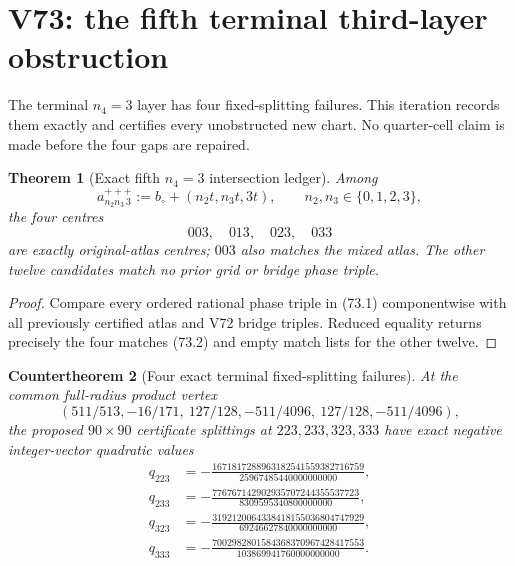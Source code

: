 \documentclass[11pt,oneside]{article}
\newtheorem{theorem}{Theorem}[section]
\newtheorem{countertheorem}[theorem]{Countertheorem}
\theoremstyle{definition}
\theoremstyle{remark}
\begin{document}
\section{V73: the fifth terminal third-layer obstruction}
\label{sec:newv73-fifth-terminal-obstruction}

The terminal \(n_4=3\) layer has four fixed-splitting failures.
This iteration records them exactly and certifies every unobstructed
new chart.  No quarter-cell claim is made before the four gaps are
repaired.

\begin{theorem}[Exact fifth \(n_4=3\) intersection ledger]
\label{thm:newv73-intersections}
Among
\[
 a_{n_2n_3\,3}^{+++}
 :=b_\circ+(n_2t,n_3t,3t),
 \qquad n_2,n_3\in\{0,1,2,3\},                       \tag{73.1}
\]
the four centres
\[
 003,\quad013,\quad023,\quad033                      \tag{73.2}
\]
are exactly original-atlas centres; \(003\) also matches the mixed
atlas.  The other twelve candidates match no prior grid or bridge
phase triple.
\end{theorem}

\begin{proof}
Compare every ordered rational phase triple in (73.1)
componentwise with all previously certified atlas and V72 bridge
triples.  Reduced equality returns precisely the four matches
(73.2) and empty match lists for the other twelve.
\end{proof}

\begin{countertheorem}[Four exact terminal fixed-splitting failures]
\label{ctr:newv73-four-failures}
At the common full-radius product vertex
\[
 (511/513,-16/171,\ 127/128,-511/4096,\
   127/128,-511/4096),                                \tag{73.3}
\]
the proposed \(90\times90\) certificate splittings at
\(223,233,323,333\) have exact negative integer-vector quadratic
values
\[
\begin{aligned}
q_{223}&=-\frac{1671817288963182541559382716759}
 {25967485440000000000},\\
q_{233}&=-\frac{776767142902935707244355537723}
 {8309595340800000000},\\
q_{323}&=-\frac{3192120064338418155036804747929}
 {69246627840000000000},\\
q_{333}&=-\frac{7002982801584368370967428417553}
 {103869941760000000000}.
\end{aligned}                                         \tag{73.4}
\]
\end{countertheorem}
\end{document}
